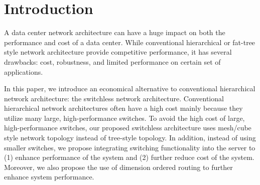 \section{Introduction}
\label{sec:intro}
A data center network architecture can have a huge impact on both the performance and cost of a data center. While conventional hierarchical or fat-tree style network architecture provide competitive performance, it has several drawbacks: cost, robustness, and limited performance on certain set of applications. 

In this paper, we introduce an economical alternative to conventional hierarchical network architecture: the switchless network architecture. Conventional hierarchical network architectures often have a high cost mainly because they utilize many large, high-performance switches. To avoid the high cost of large, high-performance switches, our proposed switchless architecture uses mesh/cube style network topology instead of tree-style topology. In addition, instead of using smaller switches, we propose integrating switching functionality into the server to (1) enhance performance of the system and (2) further reduce cost of the system. Moreover, we also propose the use of dimension ordered routing to further enhance system performance.
